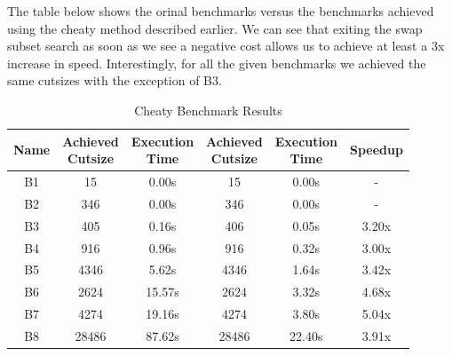 \documentclass[10pt]{article}
\begin{document}
The table below shows the orinal benchmarks versus the benchmarks achieved
using the cheaty method described earlier. We can see that exiting the swap
subset search as soon as we see a negative cost allows us to achieve at least a
3x increase in speed. Interestingly, for all the given benchmarks we achieved
the same cutsizes with the exception of B3.
\begin{table}[H]
    \centering
    \begin{tabular}{c|cc|cc|c}
        \toprule
        \textbf{Name} & \specialcell{Achieved\\Cutsize} & \specialcell{Execution\\Time} & \specialcell{Achieved\\Cutsize} & \specialcell{Execution\\Time} & \textbf{Speedup}\\
        \midrule
        B1 & 15    & \phantom{0}0.00s & 15    & \phantom{0}0.00s & - \\
        B2 & 346   & \phantom{0}0.00s & 346   & \phantom{0}0.00s & - \\
        B3 & 405   & \phantom{0}0.16s & 406   & \phantom{0}0.05s & 3.20x \\
        B4 & 916   & \phantom{0}0.96s & 916   & \phantom{0}0.32s & 3.00x \\
        B5 & 4346  & \phantom{0}5.62s & 4346  & \phantom{0}1.64s & 3.42x \\
        B6 & 2624  &           15.57s & 2624  & \phantom{0}3.32s & 4.68x \\
        B7 & 4274  &           19.16s & 4274  & \phantom{0}3.80s & 5.04x \\
        B8 & 28486 &           87.62s & 28486 &           22.40s & 3.91x \\
        \bottomrule
    \end{tabular}
    \caption{Cheaty Benchmark Results}
\end{table}
\end{document}
